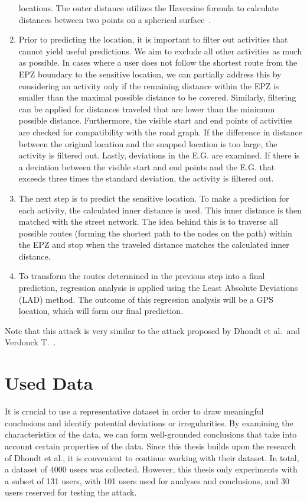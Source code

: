 \documentclass[conference]{IEEEtran}
\begin{document}
\begin{enumerate}
          locations. The outer distance utilizes the Haversine formula to calculate
          distances between two points on a spherical
          surface~\cite{sheppard1922practical}.
    \item Prior to predicting the location, it is important to filter out activities that
          cannot yield useful predictions. We aim to exclude all other activities as much
          as possible. In cases where a user does not follow the shortest route from the
          EPZ boundary to the sensitive location, we can partially address this by
          considering an activity only if the remaining distance within the EPZ is
          smaller than the maximal possible distance to be covered. Similarly, filtering
          can be applied for distances traveled that are lower than the minimum possible
          distance. Furthermore, the visible start and end points of activities are
          checked for compatibility with the road graph. If the difference in distance
          between the original location and the snapped location is too large, the
          activity is filtered out. Lastly, deviations in the E.G. are examined. If there
          is a deviation between the visible start and end points and the E.G. that
          exceeds three times the standard deviation, the activity is filtered out.
    \item The next step is to predict the sensitive location. To make a prediction for
          each activity, the calculated inner distance is used. This inner distance is
          then matched with the street network. The idea behind this is to traverse all
          possible routes (forming the shortest path to the nodes on the path) within the
          EPZ and stop when the traveled distance matches the calculated inner distance.
    \item To transform the routes determined in the previous step into a final
          prediction, regression analysis is applied using the Least Absolute Deviations
          (LAD) method. The outcome of this regression analysis will be a GPS location,
          which will form our final prediction.
\end{enumerate}
Note that this attack is very similar to the attack proposed by Dhondt et al.\ and Verdonck T.~\cite{Dhondt,Verdonck_2022}.

\section{\textbf{Used Data}}
It is crucial to use a representative dataset in order to draw meaningful
conclusions and identify potential deviations or irregularities. By examining
the characteristics of the data, we can form well-grounded conclusions that
take into account certain properties of the data. Since this thesis builds upon
the research of Dhondt et al., it is convenient to continue working with their
dataset. In total, a dataset of 4000 users was collected. However, this thesis
only experiments with a subset of 131 users, with 101 users used for analyses
and conclusions, and 30 users reserved for testing the attack.
\end{document}
